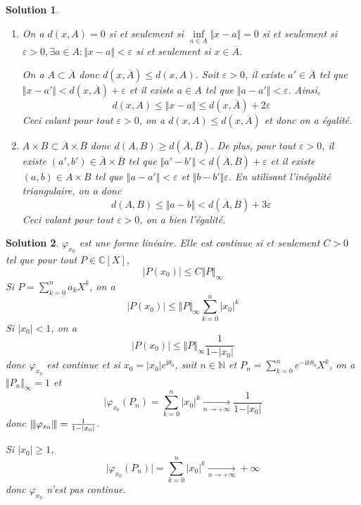 \documentclass[12pt]{article}
\newtheorem{solution}{Solution}[section]
\theoremstyle{remark}
\newcommand{\C}{\mathbb{C}} \newcommand{\Q}{\mathbb{Q}}
\newcommand{\N}{\mathbb{N}} \newcommand{\Z}{\mathbb{Z}}
\newcommand{\vertiii}[1]{{\left\vert\kern-0.25ex\left\vert\kern-0.25ex\left\vert{}#1
\right\vert\kern-0.25ex\right\vert\kern-0.25ex\right\vert}}
\numberwithin{equation}{section}
\begin{document}
\begin{solution}
	\phantom{}
	\begin{enumerate}
		\item On a $d(x,A)=0$ si et seulement si $\inf\limits_{a\in A}\Vert x-a\Vert=0$ si et seulement si $\varepsilon>0,\exists a\in A\colon\Vert x-a\Vert<\varepsilon$ si et seulement si $x\in\overline{A}$.

		On a $A\subset\overline{A}$ donc $d(x,\overline{A})\leqslant d(x,A)$. Soit $\varepsilon>0$, il existe $a'\in \overline{A}$ tel que $\Vert x-a'\Vert<d(x,\overline{A})+\varepsilon$ et il existe $a\in A$ tel que $\Vert a-a'\Vert<\varepsilon$. Ainsi, 
		$$d(x,A)\leqslant\Vert x-a\Vert\leqslant d(x,\overline{A})+2\varepsilon$$
		Ceci calant pour tout $\varepsilon>0$, on a $d(x,A)\leqslant d(x,\overline{A})$ et donc on a égalité.

		\item $A\times B\subset\overline{A}\times\overline{B}$ donc $d(A,B)\geqslant d(\overline{A},\overline{B})$. De plus, pour tout $\varepsilon>0$, il existe $(a',b')\in\overline{A}\times\overline{B}$ tel que $\Vert a'-b'\Vert<d(\overline{A},\overline{B})+\varepsilon$ et il existe $(a,b)\in A\times B$ tel que $\Vert a-a'\Vert<\varepsilon$ et $\Vert b-b'\Vert\varepsilon$. En utilisant l'inégalité triangulaire, on a donc 
		$$d(A,B)\leqslant\Vert a-b\Vert<d(\overline{A},\overline{B})+3\varepsilon$$
		Ceci valant pour tout $\varepsilon>0$, on a bien l'égalité.
	\end{enumerate}
\end{solution}

\begin{solution}
	$\varphi_{x_{0}}$ est une forme linéaire. Elle est continue si et seulement $C>0$ tel que pour tout $P\in\C[X]$,
	$$\vert P(x_{0})\vert\leqslant C\Vert P\Vert_{\infty}$$
	Si $P=\sum_{k=0}^{n}a_{k}X^{k}$, on a 
	$$\vert P(x_{0})\vert\leqslant \Vert P\Vert_{\infty}\sum_{k=0}^{n}\vert x_{0}\vert^{k}$$
	Si $\vert x_{0}\vert<1$, on a 
	$$\vert P(x_{0})\vert\leqslant \Vert P\Vert_{\infty}\frac{1}{1-\vert x_{0}\vert}$$
	donc $\varphi_{x_{0}}$ est continue et si $x_{0}=\vert x_{0}\vert e^{\mathrm{i}\theta_{0}}$, soit $n\in\N$ et $P_{n}=\sum_{k=0}^{n}e^{-\mathrm{i}k\theta_{0}}X^{k}$, on a $\Vert P_{n}\Vert_{\infty}=1$ et 
	$$\vert \varphi_{x_{0}}(P_{n})=\sum_{k=0}^{n}\vert x_{0}\vert^{k}\xrightarrow[n\to+\infty]{}\frac{1}{1-\vert x_{0}\vert}$$
	donc $\vertiii{\varphi_{x_{0}}}=\frac{1}{1-\vert x_{0}\vert}$.

	Si $\vert x_{0}\vert\geqslant1$, 
	$$\vert\varphi_{x_0}(P_{n})\vert=\sum_{k=0}^{n}\vert x_{0}\vert^{k}\xrightarrow[n\to+\infty]{}+\infty$$
	donc $\varphi_{x_{0}}$ n'est pas continue.
\end{solution}
\end{document}
